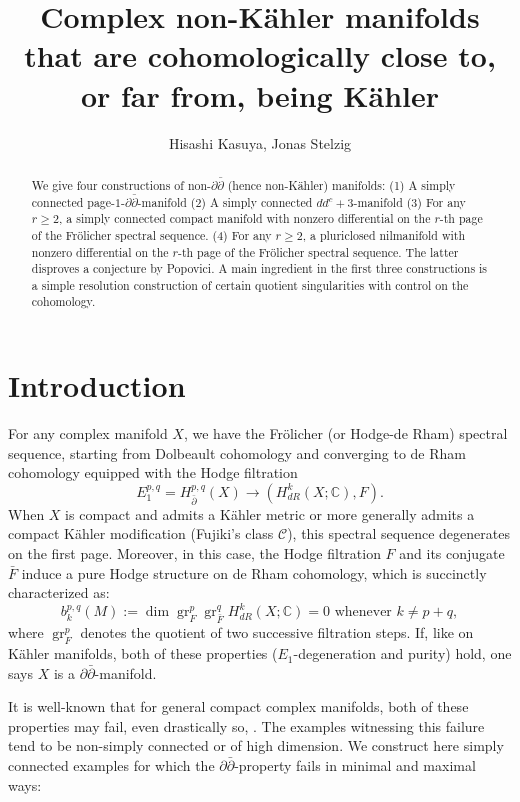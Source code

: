 \documentclass[12pt,reqno]{amsart}
\theoremstyle{definition}
\newcommand{\C}{\mathbb{C}}
\newcommand{\del}{\partial}
\newcommand{\delbar}{\bar{\del}}
\begin{document}
 

\title[]{Complex non-Kähler manifolds that are cohomologically close to, or far from, being K\"ahler}
\author{Hisashi Kasuya, Jonas Stelzig}

\subjclass[2010]{}

\keywords{}

\begin{abstract}
We give four constructions of non-$\del\delbar$ (hence non-K\"ahler) manifolds: (1) A simply connected page-$1$-$\partial\bar\partial$-manifold (2) A simply connected $dd^c+3$-manifold (3) For any $r\geq 2$, a simply connected compact manifold with nonzero differential on the $r$-th page of the Fr\"olicher spectral sequence. (4) For any $r\geq 2$, a pluriclosed nilmanifold with nonzero differential on the $r$-th page of the Fr\"olicher spectral sequence. The latter disproves a conjecture by Popovici. A main ingredient in the first three constructions is a simple resolution construction of certain quotient singularities with control on the cohomology.
\end{abstract}


\maketitle


\section{Introduction}
For any complex manifold $X$, we have the Fr\"olicher (or Hodge-de Rham) spectral sequence, starting from Dolbeault cohomology and converging to de Rham cohomology equipped with the Hodge filtration
\[
E_1^{p,q}=H^{p,q}_{\delbar}(X)\longrightarrow (H_{dR}^k(X;\C),F).
\]
When $X$ is compact and admits a K\"ahler metric or more generally admits a compact K\"ahler modification (Fujiki's class $\mathcal C$), this spectral sequence degenerates on the first page. Moreover, in this case, the Hodge filtration $F$ and its conjugate $\bar F$ induce a pure Hodge structure on de Rham cohomology, which is succinctly characterized as:
\[
b_k^{p,q}(M):=\dim\operatorname{gr}^p_F\operatorname{gr}^q_{\bar{F}}H_{dR}^k(X;\C)=0\text{ whenever }k\neq p+q,
\]
where $\operatorname{gr}^p_F$ denotes the quotient of two successive filtration steps. If, like on K\"ahler manifolds, both of these properties ($E_1$-degeneration and purity) hold, one says $X$ is a $\del\delbar$-manifold.

It is well-known that for general compact complex manifolds, both of these properties may fail, even drastically so, \cite{CFG87, Pit89, CFG91, AT11, BR14, Ste22}. The examples witnessing this failure tend to be non-simply connected or of high dimension. We construct here simply connected examples for which the $\partial\bar\partial$-property fails in minimal and maximal ways:
\end{document}
